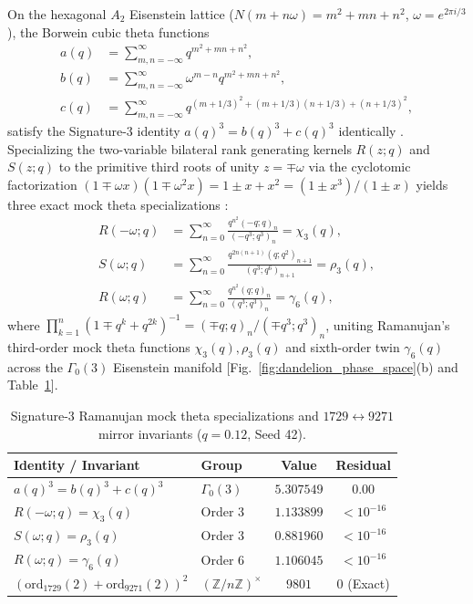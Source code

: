 \documentclass[aps,prl,twocolumn,superscriptaddress,10pt]{revtex4-2}
\begin{document}
On the hexagonal $A_2$ Eisenstein lattice ($N(m+n\omega) = m^2+mn+n^2$, $\omega = e^{2\pi i/3}$), the Borwein cubic theta functions \cite{Borwein1991}
\begin{equation}
\begin{aligned}
a(q) &= \sum_{m,n=-\infty}^{\infty} q^{m^2+mn+n^2}, \\
b(q) &= \sum_{m,n=-\infty}^{\infty} \omega^{m-n} q^{m^2+mn+n^2}, \\
c(q) &= \sum_{m,n=-\infty}^{\infty} q^{(m+1/3)^2+(m+1/3)(n+1/3)+(n+1/3)^2},
\end{aligned}
\label{eq:borwein_cubic}
\end{equation}
satisfy the Signature-3 identity $a(q)^3 = b(q)^3 + c(q)^3$ identically \cite{Borwein1991,Garvan1999}. Specializing the two-variable bilateral rank generating kernels $R(z;q)$ and $S(z;q)$ to the primitive third roots of unity $z = \mp\omega$ via the cyclotomic factorization $(1 \mp \omega x)(1 \mp \omega^2 x) = 1 \pm x + x^2 = (1 \pm x^3)/(1 \pm x)$ yields three exact mock theta specializations \cite{Watson1936,AndrewsHickerson1991,Zwegers2001,Mortenson2014}:
\begin{align}
R(-\omega; q) &= \sum_{n=0}^{\infty} \frac{q^{n^2}(-q;q)_n}{(-q^3;q^3)_n} = \chi_3(q), \label{eq:chi3_spec} \\
S(\omega; q) &= \sum_{n=0}^{\infty} \frac{q^{2n(n+1)}(q;q^2)_{n+1}}{(q^3;q^6)_{n+1}} = \rho_3(q), \label{eq:rho3_spec} \\
R(\omega; q) &= \sum_{n=0}^{\infty} \frac{q^{n^2}(q;q)_n}{(q^3;q^3)_n} = \gamma_6(q), \label{eq:gamma6_spec}
\end{align}
where $\prod_{k=1}^n (1 \mp q^k + q^{2k})^{-1} = (\mp q;q)_n / (\mp q^3;q^3)_n$, uniting Ramanujan's third-order mock theta functions $\chi_3(q), \rho_3(q)$ and sixth-order twin $\gamma_6(q)$ across the $\Gamma_0(3)$ Eisenstein manifold [Fig.~\ref{fig:dandelion_phase_space}(b) and Table~\ref{tab:ramanujan_audit}].

\begin{table}[t]
\caption{Signature-3 Ramanujan mock theta specializations and $1729 \leftrightarrow 9271$ mirror invariants ($q=0.12$, Seed 42).}
\label{tab:ramanujan_audit}
\begin{ruledtabular}
\footnotesize
\begin{tabular*}{\columnwidth}{@{\extracolsep{\fill}}llcc}
Identity / Invariant & Group & Value & Residual \\
\hline
$a(q)^3 = b(q)^3 + c(q)^3$ & $\Gamma_0(3)$ & $5.307549$ & $0.00$ \\
$R(-\omega;q) = \chi_3(q)$ & Order 3 & $1.133899$ & $< 10^{-16}$ \\
$S(\omega;q) = \rho_3(q)$ & Order 3 & $0.881960$ & $< 10^{-16}$ \\
$R(\omega;q) = \gamma_6(q)$ & Order 6 & $1.106045$ & $< 10^{-16}$ \\
$(\text{ord}_{1729}(2)+\text{ord}_{9271}(2))^2$ & $(\mathbb{Z}/n\mathbb{Z})^\times$ & $9801$ & $0$ (Exact) \\
\end{tabular*}
\end{ruledtabular}
\end{table}
\end{document}
